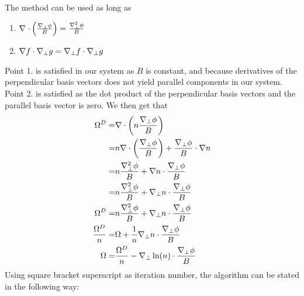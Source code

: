 The method can be used as long as
%
\begin{enumerate}
    \item $\nabla\cdot\left(\frac{\nabla_\perp\phi}{B}\right) = \frac{\nabla_\perp^2\phi}{B}$
    \item $\nabla f \cdot \nabla_\perp g = \nabla_\perp f \cdot \nabla_\perp g$
\end{enumerate}
%
Point 1. is satisfied in our system as $B$ is constant, and because derivatives of the perpendicular basis vectors does not yield parallel components in our system.
Point 2. is satisfied as the dot product of the perpendicular basis vectors and the parallel basis vector is zero.
We then get that
%
\begin{align*}
    \Omega^D =& \nabla\cdot\left(n\frac{\nabla_\perp\phi}{B}\right)\\
    =& n\nabla\cdot\left(\frac{\nabla_\perp\phi}{B}\right) +
    \frac{\nabla_\perp\phi}{B}\cdot\nabla n
    \\
    =& n\frac{\nabla_\perp^2\phi}{B} +
    \nabla n\cdot\frac{\nabla_\perp\phi}{B}
    \\
    =& n\frac{\nabla_\perp^2\phi}{B} +
    \nabla_\perp n\cdot\frac{\nabla_\perp\phi}{B}
    \\
    \Omega^D =& n\frac{\nabla_\perp^2\phi}{B} +
    \nabla_\perp n\cdot\frac{\nabla_\perp\phi}{B}
    \\
    \frac{\Omega^D}{n} =& \Omega +
    \frac{1}{n}\nabla_\perp n\cdot\frac{\nabla_\perp\phi}{B}
    \\
    \Omega =& \frac{\Omega^D}{n} -
    \nabla_\perp \ln(n) \cdot\frac{\nabla_\perp\phi}{B}
\end{align*}
%
Using square bracket superscript as iteration number, the algorithm can be stated in the following way:
%
